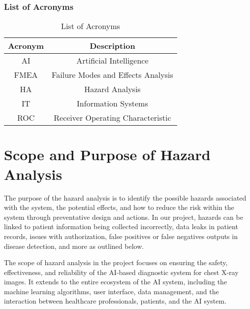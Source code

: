 \documentclass{article}
\begin{document}
    \subsubsection{List of Acronyms}
    \begin{table}[hbt!]
        \centering
        \caption{List of Acronyms}
        \label{ListofAcronyms}
        \begin{tabular}{|c|c|}
        \hline
            Acronym & Description\\
            \hline
            AI  & Artificial Intelligence\\
            FMEA & Failure Modes and Effects Analysis \\
            HA & Hazard Analysis\\
            IT  & Information Systems\\
            ROC & Receiver Operating Characteristic\\
            \hline
        \end{tabular}
    \end{table}

\section{Scope and Purpose of Hazard Analysis}
The purpose of the hazard analysis is to identify the possible hazards associated with the system, the potential effects, and how to reduce the risk within the system through preventative design and actions. In our project, hazards can be linked to patient information being collected incorrectly, data leaks in patient records, issues with authorization, false positives or false negatives outputs in disease detection, and more as outlined below.

\noindent The scope of hazard analysis in the project focuses on ensuring the safety, effectiveness, and reliability of the AI-based diagnostic system for chest X-ray images. It extends to the entire ecosystem of the AI system, including the machine learning algorithms, user interface, data management, and the interaction between healthcare professionals, patients, and the AI system.
\end{document}
